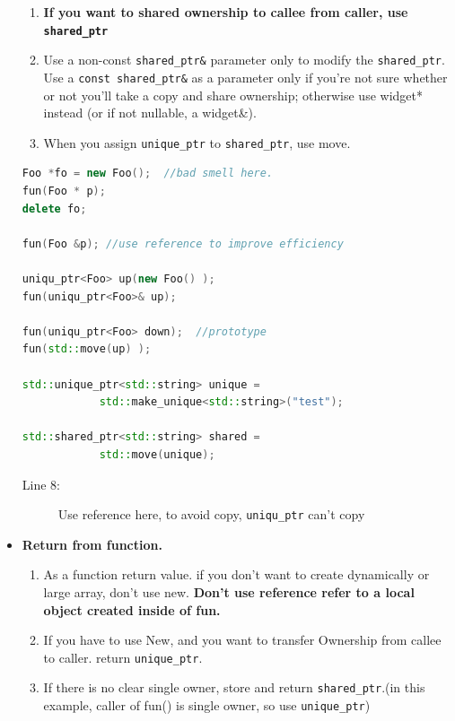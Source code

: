 \documentclass[a4paper,11pt,twoside]{book}
\begin{document}
\begin{itemize}
\begin{enumerate}
    \item \textbf{If you want to shared ownership to callee from caller, use \texttt{shared\_ptr}}

    \item Use a non-const \texttt{shared\_ptr\&} parameter only to modify the \texttt{shared\_ptr}. Use a \texttt{const shared\_ptr\&} as a parameter only if you're not sure whether or not you'll take a copy and share ownership; otherwise use widget* instead (or if not nullable, a widget\&).

    \item When you assign \texttt{unique\_ptr} to \texttt{shared\_ptr}, use move.
\end{enumerate}

\begin{lstlisting}[frame=single, language=c++]
Foo *fo = new Foo();  //bad smell here.
fun(Foo * p);
delete fo;

fun(Foo &p); //use reference to improve efficiency

uniqu_ptr<Foo> up(new Foo() );
fun(uniqu_ptr<Foo>& up);

fun(uniqu_ptr<Foo> down);  //prototype
fun(std::move(up) );

std::unique_ptr<std::string> unique = 
			std::make_unique<std::string>("test");
			
std::shared_ptr<std::string> shared = 
			std::move(unique);
\end{lstlisting}

\begin{description}
	\item[Line 8:] Use reference here, to avoid copy, \texttt{uniqu\_ptr} can't copy
\end{description}

\item \textbf{Return from function.}
\begin{enumerate}

    \item As a function return value. if you don't want to create dynamically or large array, don't use new. \textbf{Don't  use reference refer to a local object created inside of fun.}

    \item If you have to use New, and you want to transfer Ownership from callee to caller. return \texttt{unique\_ptr}.

    \item If there is no clear single owner, store and return \texttt{shared\_ptr}.(in this example, caller of fun() is single owner, so use \texttt{unique\_ptr})


\end{enumerate}
\end{itemize}
\end{document}
